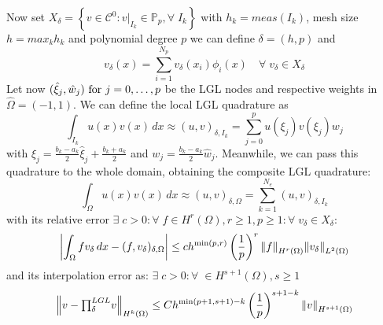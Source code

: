 Now set \(X_\delta = \left\{ v \in \mathcal{C}^0 : v\vert_{I_k} \in \mathbb{P}_p, \forall \; I_k \right\}\) with \(h_k = meas(I_k)\), mesh size \(h =  max_k h_k\) and polynomial degree \(p\) we can define \(\delta = (h,p)\) and 
\[
    v_\delta(x) = \sum_{i=1}^{N_p} v_\delta (x_i)\phi_i(x) \quad \forall \; v_\delta \in X_\delta
\]
Let now \((\hat{\xi}_j, \hat{w}_j) \text{ for } j = 0, \ldots, p\) be the LGL nodes and respective weights in \(\hat{\Omega} = (-1,1)\).
We can define the local LGL quadrature as
\[
    \int_{I_k} u(x)v(x) \, dx \approx (u,v)_{\delta, I_k} = \sum_{j=0}^{p} u(\xi_j)v(\xi_j)w_j
\]
with \(\xi_j = \frac{b_k - a_k}{2}\hat{\xi}_j + \frac{b_k + a_k}{2}\) and \(w_j = \frac{b_k -a_k}{2}\hat{w}_j\).
Meanwhile, we can pass this quadrature to the whole domain, obtaining the composite LGL quadrature:
\[
    \int_\Omega u(x)v(x)\, dx \approx (u,v)_{\delta, \Omega} = \sum_{k=1}^{N_e} (u,v)_{\delta, I_k}
\]
with its relative error \(\exists \; c > 0 : \forall \; f \in H^r(\Omega), r\geq 1, p \geq 1 : \forall \; v_\delta \in X_\delta \):
\[
    \abs{\int_{\Omega} fv_\delta \, dx - (f, v_\delta)_{\delta, \Omega}} \leq c h^{\min(p,r)}\left( \frac{1}{p} \right)^r \norm{f}_{H^r(\Omega)}\norm{v_\delta}_{L^2(\Omega)}
\]
and its interpolation error as: \(\exists \; c > 0 : \forall \;\in H^{s+1}(\Omega), s \geq 1\)
\[
    \norm{v - {\textstyle \prod_{\delta}^{LGL}}v}_{H^k(\Omega)} \leq Ch^{\min(p+1, s+1)-k}\left( \frac{1}{p} \right)^{s+1-k}\norm{v}_{H^{s+1}(\Omega)}
\] 
